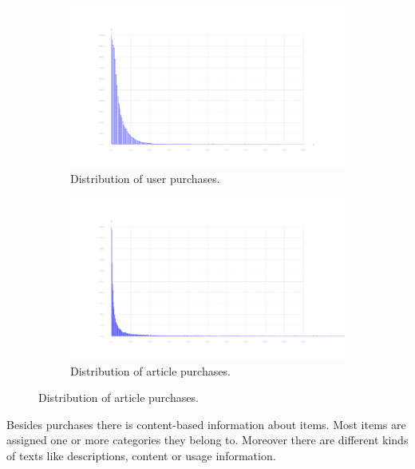 \documentclass[10pt]{reportMaster}
\begin{document}

\begin{figure}
	\label{fig:dataDistribution}
	\begin{subfigure}[c]{1\textwidth}
		\caption{Distribution of user purchases.}
		\centering
		\includegraphics[width=1\textwidth]{figures/experiments/userPurchaseHistogram}
	\end{subfigure}
	\begin{subfigure}[c]{1\textwidth}
		\caption{Distribution of article purchases.}
		\centering
		\includegraphics[width=1\textwidth]{figures/experiments/articlePurchaseHistogram_partly}
	\end{subfigure}
	
\end{figure}

Besides purchases there is content-based information about items.
Most items are assigned one or more categories they belong to.
Moreover there are different kinds of texts like descriptions, content or usage information.
\end{document}
